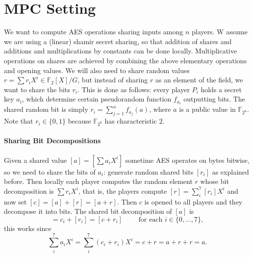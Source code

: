 \documentclass[11pt]{article}
\begin{document}
\section*{MPC Setting}
We want to compute AES operations sharing inputs among $n$ players. W assume we are using a (linear) shamir secret sharing, so that addition of shares and additions and multiplications by constants can be done locally. Multiplicative operations on shares are achieved by combining the above elementary operations and opening values. We will also need to share random values $r=\sum r_iX^i \in \mathbb{F}_2[X]/G$, but instead of sharing $r$ as an element of the field, we want to share the bits $r_i$. This is done as follows: every player $P_i$ holds a secret key $a_i$, which determine certain pseudorandom function $f_{a_i}$ outputting bits. The shared random bit is simply $r_i = \sum_{j=1}^nf_{a_j}(a)$, where $a$ is a public value in $\mathbb{F}_{2^8}$. Note that $r_i \in \{ 0,1 \}$ because $\mathbb{F}_{2^8}$ has characteristic $2$.
\\ \\
\textbf{Sharing Bit Decompositions}
\\ \\
Given a shared value $[a] = [\sum a_iX^i]$ sometime AES operates on bytes bitwise, so we need to share the bits of $a_i$: generate random shared bits $[r_i]$ as explained before. Then locally each player computes the random element $r$ whose bit decomposition is $\sum r_iX^i$, that is, the players compute $[r] = \sum_i^7 [r_i]X^i$ and now set $[c]=[a] +[r]=[a+r]$. Then $c$ is opened to all players and they decompose it into bits. The shared bit decomposition of $[a]$ is 
\begin{equation*}
[a_i] = c_i + [r_i] = [c + r_i] \qquad \text{ for each } i \in \{ 0, \ldots, 7 \},
\end{equation*}
this works since
\begin{equation*}
  \sum_i^7 a_iX^i = \sum_i^7 (c_i +r_i)X^i = c+r=a+r+r=a.
\end{equation*} 
\end{document}
